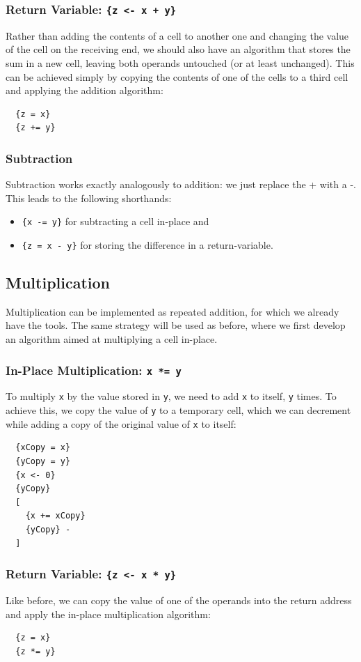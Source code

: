 \subsubsection{Return Variable: \texttt{\{z <- x + y\}}}
Rather than adding the contents of a cell to another one and changing the value of the cell on the receiving end, we should also have an algorithm that stores the sum in a new cell, leaving both operands untouched (or at least unchanged). This can be achieved simply by copying the contents of one of the cells to a third cell and applying the addition algorithm:
\begin{lstlisting}
  {z = x}
  {z += y}
\end{lstlisting}

\subsubsection{Subtraction}
Subtraction works exactly analogously to addition: we just replace the + with a -. This leads to the following shorthands:
\begin{itemize}
\item \texttt{\{x -= y\}} for subtracting a cell in-place and
\item \texttt{\{z = x - y\}} for storing the difference in a return-variable.
\end{itemize}

\subsection{Multiplication}
Multiplication can be implemented as repeated addition, for which we already have the tools. The same strategy will be used as before, where we first develop an algorithm aimed at multiplying a cell in-place.
\subsubsection{In-Place Multiplication: \texttt{x *= y}}
To multiply \texttt{x} by the value stored in \texttt{y}, we need to add \texttt{x} to itself, \texttt{y} times. To achieve this, we copy the value of \texttt{y} to a temporary cell, which we can decrement while adding a copy of the original value of \texttt{x} to itself:
\begin{lstlisting}
  {xCopy = x}
  {yCopy = y}
  {x <- 0}
  {yCopy}
  [
    {x += xCopy}
    {yCopy} -
  ]
\end{lstlisting}

\subsubsection{Return Variable: \texttt{\{z <- x * y\}}}
Like before, we can copy the value of one of the operands into the return address and apply the in-place multiplication algorithm:
\begin{lstlisting}
  {z = x}
  {z *= y}
\end{lstlisting}

